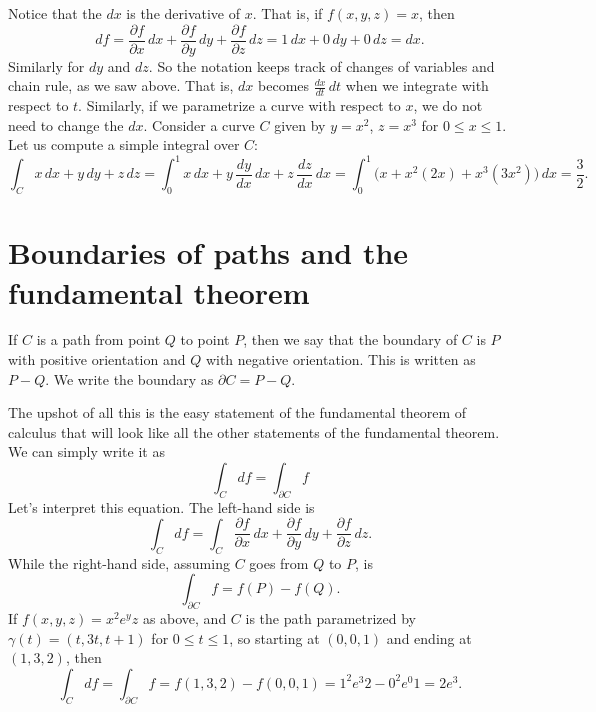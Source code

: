 \documentclass[12pt]{article}
\begin{document}
Notice that the $dx$ is the derivative of $x$.  That is, if $f(x,y,z) = x$, then
\[
df =
\frac{\partial f}{\partial x}\, dx + 
\frac{\partial f}{\partial y}\, dy + 
\frac{\partial f}{\partial z}\, dz =
1\, dx + 
0\, dy + 
0\, dz = dx .
\]
Similarly for $dy$ and $dz$.  So the notation keeps track of changes of
variables and chain rule, as we saw above.  That is, $dx$ becomes
$\frac{dx}{dt} \, dt$ when we integrate with respect to $t$.  Similarly, if we
parametrize a curve with respect to $x$, we do not need to change the $dx$.
Consider a curve $C$
given by $y=x^2$, $z=x^3$ for $0 \leq x \leq 1$.  Let us compute a
simple integral over $C$:
\begin{equation*}
\int_C x \, dx + y \, dy + z \, dz
=
\int_0^1 x \, dx + y \, \frac{dy}{dx} \, dx + z \, \frac{dz}{dx} \, dx
=
\int_0^1 \bigl( x + x^2 (2x) + x^3 (3x^2) \bigr) \, dx
=
\frac{3}{2} .
\end{equation*}

\section*{Boundaries of paths and the fundamental theorem}

If $C$ is a path from point $Q$ to point $P$, then we say that the boundary
of $C$ is $P$ with positive orientation and $Q$ with negative orientation.
This is written as $P-Q$.  We write the boundary as $\partial C = P-Q$.

The upshot of all this is the easy statement of the fundamental theorem
of calculus that will look like all the other statements of the fundamental
theorem.  We can simply write it as
\[
\int_C df = \int_{\partial C} f
\]
Let's interpret this equation.  The left-hand side is
\[
\int_C df = \int_C \frac{\partial f}{\partial x}\, dx + 
\frac{\partial f}{\partial y}\, dy + 
\frac{\partial f}{\partial z}\, dz .
\]
While the right-hand side, assuming $C$ goes from $Q$ to $P$, is
\[
\int_{\partial C} f = f(P) - f(Q) .
\]
If $f(x,y,z) = 
x^2e^yz$ as above, and $C$ is the path parametrized by
$\gamma(t) = (t,3t,t+1)$ for $0 \leq t \leq 1$, so starting at $(0,0,1)$ and ending
at $(1,3,2)$, then
\[
\int_C df = \int_{\partial C} f = f(1,3,2)-f(0,0,1) = 1^2 e^3 2 - 0^2e^0 1 =
2e^3.
\]
\end{document}
